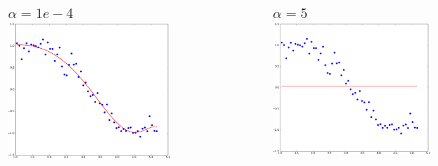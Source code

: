 \documentclass[handout, 10pt]{beamer}
\begin{document}
\begin{frame}
\begin{columns}
\vspace{-2em}
\begin{figure}
$\alpha=1e-4$
\includegraphics[width=0.99\textwidth]{./lasso_alpha1e-4.png}
\end{figure}
\vspace{-2em}
\begin{figure}
$\alpha=5$
\includegraphics[width=0.99\textwidth]{./lasso_alpha5.png}
\end{figure}
\end{columns}
\end{frame}
\end{document}
